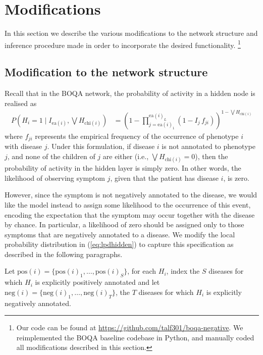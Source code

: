 \section{Modifications}
\label{sec:models}

In this section we describe the various modifications to
the network structure and inference procedure made in order to incorporate the
desired functionality.
\footnote{
    Our code can be found at
    \url{https://github.com/talf301/boqa-negative}.
    We reimplemented the BOQA baseline codebase in Python, and manually coded all
    modifications described in this section.
}

\subsection{Modification to the network structure}
\label{subsec:modnetstruct}

Recall that in the BOQA network, the probability of activity in a hidden node is
realised as  
%
\begin{align}\label{eq:lpdhidden}
    P \left(H_i = 1 \mid I_{\text{ea}(i)}, \bigvee H_{\text{chi}(i)}\right)
    &= \left(
        1 - \prod_{j=\text{ea}(i)_1}^{\text{ea}(i)_L}
        \left(1 - I_j \, f_{ji}\right)
    \right)
    ^{1 - \bigvee H_{\text{chi}(i)}}
\end{align}
%
where $f_{ji}$ represents the empirical frequency of the occurrence of phenotype
$i$ with disease $j$.
%
Under this formulation, if disease $i$ is not annotated to phenotype $j$, 
and none of the children of $j$ are either (i.e., $\bigvee H_{\text{chi}(i)} = 0$),
then the probability of activity in the hidden layer is simply zero.
%
In other words, the likelihood of observing symptom $j$, given that the patient
has disease $i$, is zero.

However, since the symptom is not negatively annotated to the disease, we would
like the model instead to assign some likelihood to the occurrence of this event,
encoding the expectation that the symptom may occur together with the disease
by chance.
%
In particular, a likelihood of zero should be assigned only to those symptoms
that are negatively annotated to a disease.
%
We modify the local probability distribution in (\ref{eq:lpdhidden}) to capture
this specification as described in the following paragraphs.

Let $\text{pos}(i) = \{\text{pos}(i)_1, \hdots, \text{pos}(i)_S\}$, for each
$H_i$, index the $S$ diseases for which $H_i$ is explicitly positively
annotated and let $\text{neg}(i) = \{\text{neg}(i)_1, \hdots,
\text{neg}(i)_T\}$, the $T$ diseases for which $H_i$ is explicitly negatively
annotated.


